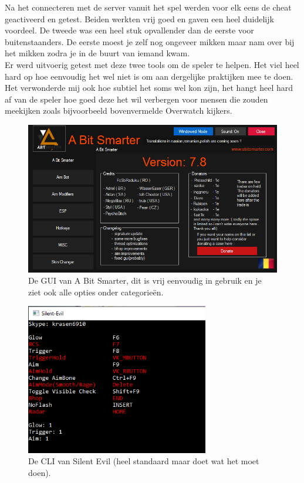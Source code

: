 \documentclass[pdftex,a4paper,12pt,twoside]{report}
\begin{document}
Na het connecteren met de server vanuit het spel werden voor elk eens de \gls{cheat} geactiveerd en getest. Beiden werkten vrij goed en gaven een heel duidelijk voordeel. De tweede was een heel stuk opvallender dan de eerste voor buitenstaanders. De eerste moest je zelf nog ongeveer mikken maar nam over bij het mikken zodra je in de buurt van iemand kwam.
\\

Er werd uitvoerig getest met deze twee tools om de speler te helpen. Het viel heel hard op hoe eenvoudig het wel niet is om aan dergelijke praktijken mee te doen. Het verwonderde mij ook hoe subtiel het soms wel kon zijn, het hangt heel hard af van de speler hoe goed deze het wil verbergen voor mensen die zouden meekijken zoals bijvoorbeeld bovenvermelde Overwatch kijkers.

\begin{figure}
\centering
\includegraphics[width=12cm]{img/abitsmarter}
\caption{De GUI van A Bit Smarter, dit is vrij eenvoudig in gebruik en je ziet ook alle opties onder categorieën.}
\end{figure}
\begin{figure}
\centering
\includegraphics[width=8cm]{img/silentevil}
\caption{De CLI van Silent Evil (heel standaard maar doet wat het moet doen).}
\end{figure}
\end{document}
